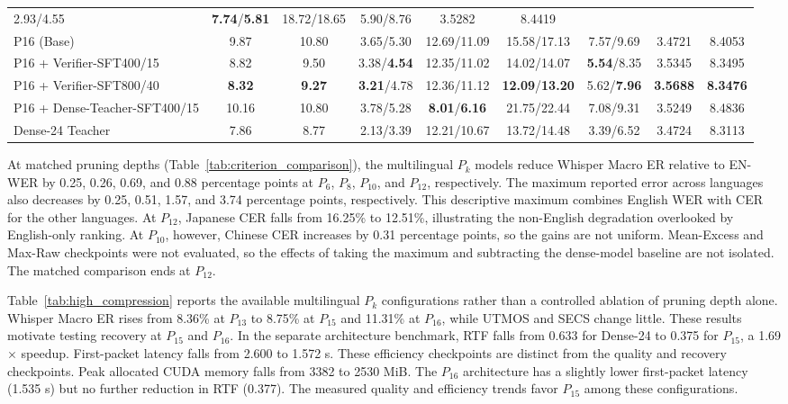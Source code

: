 \documentclass{article}
\begin{document}
\begin{table}[!t]
\begin{tabular}{lcccccccc}
2.93/4.55 & \textbf{7.74}/\textbf{5.81} & 18.72/18.65 & 5.90/8.76 & 3.5282 & 8.4419 \\
\addlinespace
P16 (Base) & 9.87 & 10.80 &
3.65/5.30 & 12.69/11.09 & 15.58/17.13 & 7.57/9.69 & 3.4721 & 8.4053 \\
P16 + Verifier-SFT400/15 & 8.82 & 9.50 &
3.38/\textbf{4.54} & 12.35/11.02 & 14.02/14.07 & \textbf{5.54}/8.35 & 3.5345 & 8.3495 \\
P16 + Verifier-SFT800/40 & \textbf{8.32} & \textbf{9.27} &
\textbf{3.21}/4.78 & 12.36/11.12 & \textbf{12.09}/\textbf{13.20} & 5.62/\textbf{7.96} & \textbf{3.5688} & \textbf{8.3476} \\
P16 + Dense-Teacher-SFT400/15 & 10.16 & 10.80 &
3.78/5.28 & \textbf{8.01}/\textbf{6.16} & 21.75/22.44 & 7.08/9.31 & 3.5249 & 8.4836 \\
\addlinespace
Dense-24 Teacher & 7.86 & 8.77 &
2.13/3.39 & 12.21/10.67 & 13.72/14.48 & 3.39/6.52 & 3.4724 & 8.3113 \\
\bottomrule
\end{tabular}
\end{table}

\setlength{\dbltextfloatsep}{8pt plus 2pt minus 2pt}

At matched pruning depths (Table~\ref{tab:criterion_comparison}),
the multilingual \(P_k\) models reduce Whisper Macro ER relative
to EN-WER by 0.25,
0.26, 0.69, and 0.88 percentage points at \(P_6\), \(P_8\),
\(P_{10}\), and \(P_{12}\), respectively. The maximum reported error
across languages also decreases by 0.25, 0.51, 1.57, and 3.74
percentage points, respectively. This descriptive maximum combines
English WER with CER for the other languages. At \(P_{12}\), Japanese
CER falls from 16.25\% to 12.51\%, illustrating the non-English
degradation overlooked by English-only ranking. At
\(P_{10}\), however, Chinese CER increases by 0.31 percentage points,
so the gains are not uniform. Mean-Excess and Max-Raw checkpoints
were not evaluated, so the effects of taking the maximum and
subtracting the dense-model baseline are not isolated.
The matched comparison ends at \(P_{12}\).

Table~\ref{tab:high_compression} reports the available multilingual
\(P_k\) configurations rather than a controlled ablation of pruning
depth alone. Whisper Macro ER rises from 8.36\% at
\(P_{13}\) to 8.75\% at \(P_{15}\) and 11.31\% at \(P_{16}\),
while UTMOS and SECS change little. These results motivate testing
recovery at \(P_{15}\) and \(P_{16}\). In the separate
architecture benchmark, RTF falls from 0.633 for Dense-24 to 0.375
for \(P_{15}\), a 1.69$\times$ speedup. First-packet latency falls from 2.600
to 1.572 s. These efficiency checkpoints are distinct from the
quality and recovery checkpoints. Peak allocated CUDA memory falls
from 3382 to 2530 MiB. The \(P_{16}\) architecture has a slightly
lower first-packet latency (1.535 s) but no further reduction in RTF (0.377).
The measured quality and efficiency trends favor \(P_{15}\) among
these configurations.
\end{document}
